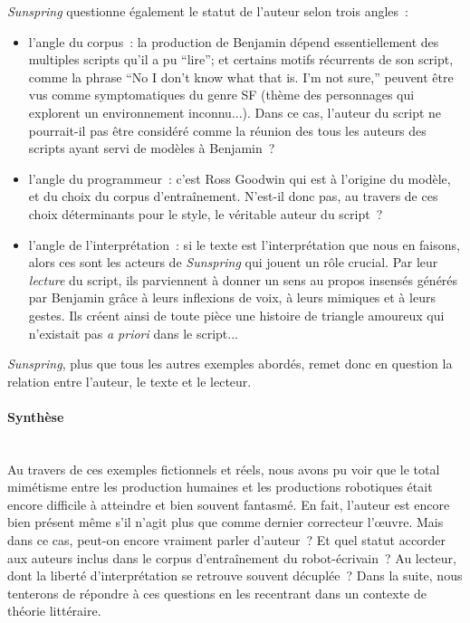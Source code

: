 \documentclass{article}
\newcommand{\subsubsubsection}[1]{\paragraph{#1}\mbox{}\\}
\begin{document}
					\textit{Sunspring} questionne également le statut de l'auteur selon trois angles~:
					\vspace{2mm}
					\begin{itemize}
						\item l'angle du corpus~: la production de Benjamin dépend essentiellement des multiples scripts qu'il a pu ``lire''; et certains motifs récurrents de son script, comme la phrase ``No I don’t know what that is. I’m not sure,'' peuvent être vus comme symptomatiques du genre SF (thème des personnages qui explorent un environnement inconnu...). Dans ce cas, l'auteur du script ne pourrait-il pas être considéré comme la réunion des tous les auteurs des scripts ayant servi de modèles à Benjamin~?
						\item l'angle du programmeur~: c'est Ross Goodwin qui est à l'origine du modèle, et du choix du corpus d'entraînement. N'est-il donc pas, au travers de ces choix déterminants pour le style, le véritable auteur du script~?
						\item l'angle de l'interprétation~: si le texte est l'interprétation que nous en faisons, alors ces sont les acteurs de \textit{Sunspring} qui jouent un rôle crucial. Par leur \textit{lecture} du script, ils parviennent à donner un sens au propos insensés générés par Benjamin grâce à leurs inflexions de voix, à leurs mimiques et à leurs gestes. Ils créent ainsi de toute pièce une histoire de triangle amoureux qui n'existait pas \textit{a priori} dans le script...
					\end{itemize}
					\vspace{2mm}
					\textit{Sunspring}, plus que tous les autres exemples abordés, remet donc en question la relation entre l'auteur, le texte et le lecteur.
				\subsubsubsection{Synthèse}
					Au travers de ces exemples fictionnels et réels, nous avons pu voir que le total mimétisme entre les production humaines et les productions robotiques était encore difficile à atteindre et bien souvent fantasmé. En fait, l'auteur est encore bien présent même s'il n'agit plus que comme dernier correcteur l'œuvre. Mais dans ce cas, peut-on encore vraiment parler d'auteur~? Et quel statut accorder aux auteurs inclus dans le corpus d'entraînement du robot-écrivain~? Au lecteur, dont la liberté d'interprétation se retrouve souvent décuplée~? Dans la suite, nous tenterons de répondre à ces questions en les recentrant dans un contexte de théorie littéraire.
\end{document}
